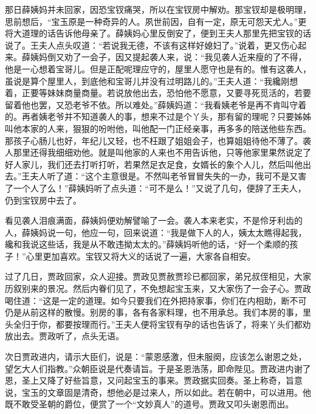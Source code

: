 \begin{parag}
    那日薛姨妈并未回家，因恐宝钗痛哭，所以在宝钗房中解劝。那宝钗却是极明理，思前想后，“宝玉原是一种奇异的人。夙世前因，自有一定，原无可怨天尤人。”更将大道理的话告诉他母亲了。薛姨妈心里反倒安了，便到王夫人那里先把宝钗的话说了。王夫人点头叹道：“若说我无德，不该有这样好媳妇了。”说着，更又伤心起来。薛姨妈倒又劝了一会子，因又提起袭人来，说：“我见袭人近来瘦的了不得，他是一心想着宝哥儿。但是正配呢理应守的，屋里人愿守也是有的。惟有这袭人，虽说是算个屋里人，到底他和宝哥儿并没有过明路儿的。”王夫人道：“我纔刚想着，正要等妹妹商量商量。若说放他出去，恐怕他不愿意，又要寻死觅活的，若要留着他也罢，又恐老爷不依。所以难处。”薛姨妈道：“我看姨老爷是再不肯叫守着的。再者姨老爷并不知道袭人的事，想来不过是个丫头，那有留的理呢？只要姊姊叫他本家的人来，狠狠的吩咐他，叫他配一门正经亲事，再多多的陪送他些东西。那孩子心肠儿也好，年纪儿又轻，也不枉跟了姐姐会子，也算姐姐待他不薄了。袭人那里还得我细细劝他。就是叫他家的人来也不用告诉他，只等他家里果然说定了好人家儿，我们还去打听打听，若果然足衣足食，女婿长的象个人儿，然后叫他出去。”王夫人听了道：“这个主意很是。不然叫老爷冒冒失失的一办，我可不是又害了一个人了么！”薛姨妈听了点头道：“可不是么！”又说了几句，便辞了王夫人，仍到宝钗房中去了。
\end{parag}


\begin{parag}
    看见袭人泪痕满面，薛姨妈便劝解譬喻了一会。袭人本来老实，不是伶牙利齿的人，薛姨妈说一句，他应一句，回来说道：“我是做下人的人，姨太太瞧得起我，纔和我说这些话，我是从不敢违拗太太的。”薛姨妈听他的话，“好一个柔顺的孩子！”心里更加喜欢。宝钗又将大义的话说了一遍，大家各自相安。
\end{parag}


\begin{parag}
    过了几日，贾政回家，众人迎接。贾政见贾赦贾珍已都回家，弟兄叔侄相见，大家历叙别来的景况。然后内眷们见了，不免想起宝玉来，又大家伤了一会子心。贾政喝住道：“这是一定的道理。如今只要我们在外把持家事，你们在内相助，断不可仍是从前这样的散慢。别房的事，各有各家料理，也不用承总。我们本房的事，里头全归于你，都要按理而行。”王夫人便将宝钗有孕的话也告诉了，将来丫头们都劝放出去。贾政听了，点头无语。
\end{parag}


\begin{parag}
    次日贾政进内，请示大臣们，说是：“蒙恩感激，但未服阕，应该怎么谢恩之处，望乞大人们指教。”众朝臣说是代奏请旨。于是圣恩浩荡，即命陛见。贾政进内谢了恩，圣上又降了好些旨意，又问起宝玉的事来。贾政据实回奏。圣上称奇，旨意说，宝玉的文章固是清奇，想他必是过来人，所以如此。若在朝中，可以进用。他既不敢受圣朝的爵位，便赏了一个“文妙真人”的道号。贾政又叩头谢恩而出。
\end{parag}



